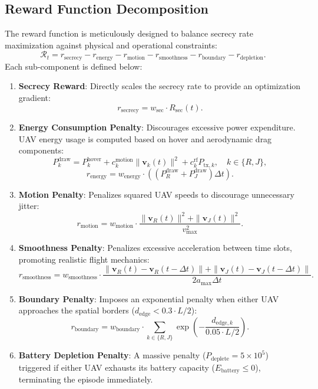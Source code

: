 \documentclass[journal,onecolumn]{IEEEtran}
\begin{document}
\subsection{Reward Function Decomposition}
The reward function is meticulously designed to balance secrecy rate maximization against physical and operational constraints:
\begin{equation}
    \mathcal{R}_t = r_{\text{secrecy}} - r_{\text{energy}} - r_{\text{motion}} - r_{\text{smoothness}} - r_{\text{boundary}} - r_{\text{depletion}}.
\end{equation}
Each sub-component is defined below:
\begin{enumerate}
    \item \textbf{Secrecy Reward}: Directly scales the secrecy rate to provide an optimization gradient:
    \begin{equation}
        r_{\text{secrecy}} = w_{\text{sec}} \cdot R_{\text{sec}}(t).
    \end{equation}
    \item \textbf{Energy Consumption Penalty}: Discourages excessive power expenditure. UAV energy usage is computed based on hover and aerodynamic drag components:
    \begin{equation}
        P_k^{\text{draw}} = P_k^{\text{hover}} + c_k^{\text{motion}} \|\mathbf{v}_k(t)\|^2 + c_k^{\text{rf}} P_{\text{tx},k}, \quad k \in \{R, J\},
    \end{equation}
    \begin{equation}
        r_{\text{energy}} = w_{\text{energy}} \cdot \left( (P_R^{\text{draw}} + P_J^{\text{draw}}) \Delta t \right).
    \end{equation}
    \item \textbf{Motion Penalty}: Penalizes squared UAV speeds to discourage unnecessary jitter:
    \begin{equation}
        r_{\text{motion}} = w_{\text{motion}} \cdot \frac{\|\mathbf{v}_R(t)\|^2 + \|\mathbf{v}_J(t)\|^2}{v_{\max}^2}.
    \end{equation}
    \item \textbf{Smoothness Penalty}: Penalizes excessive acceleration between time slots, promoting realistic flight mechanics:
    \begin{equation}
        r_{\text{smoothness}} = w_{\text{smoothness}} \cdot \frac{\|\mathbf{v}_R(t) - \mathbf{v}_R(t-\Delta t)\| + \|\mathbf{v}_J(t) - \mathbf{v}_J(t-\Delta t)\|}{2 a_{\max} \Delta t}.
    \end{equation}
    \item \textbf{Boundary Penalty}: Imposes an exponential penalty when either UAV approaches the spatial borders ($d_{\text{edge}} < 0.3 \cdot L/2$):
    \begin{equation}
        r_{\text{boundary}} = w_{\text{boundary}} \cdot \sum_{k \in \{R, J\}} \exp\left( - \frac{d_{\text{edge}, k}}{0.05 \cdot L/2} \right).
    \end{equation}
    \item \textbf{Battery Depletion Penalty}: A massive penalty ($P_{\text{deplete}} = 5 \times 10^5$) triggered if either UAV exhausts its battery capacity ($E_{\text{battery}} \le 0$), terminating the episode immediately.
\end{enumerate}
\end{document}
